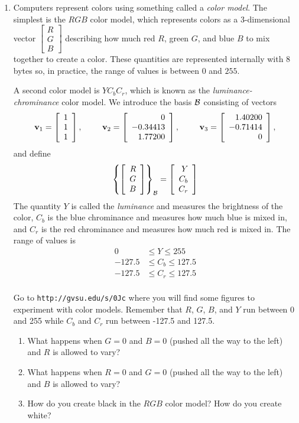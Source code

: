 \documentclass[12pt]{article}
\newcommand{\vs}[1]{\vspace{#1in}}
\newcommand{\vvec}{{\mathbf v}}
\newcommand{\threevec}[3]{\left[\begin{array}{r}#1 \\ #2 \\ #3
  \end{array}\right]}
\newcommand{\bcal}{{\cal B}}
\newcommand{\coords}[2]{\left\{#1\right\}_{#2}}
\begin{document}
\begin{enumerate}
  \vs{1}

\item Computers represent colors using something called a  {\em color
    model}.  The simplest is the $RGB$ color
  model, which represents colors as a 3-dimensional vector
  $\threevec RGB$ describing how much red $R$, green $G$, and blue $B$
  to mix together to create a color.  These quantities are represented
  internally with 8 bytes so, in practice, the range of values is
  between $0$ and $255$.

  A second color model is $YC_bC_r$, which is known as the {\em
    luminance-chrominance} color model.  We introduce the
  basis $\bcal$ consisting of vectors
  $$
  \vvec_1 = \threevec 111, \hspace*{24pt}
  \vvec_2 = \threevec 0{-0.34413}{1.77200}, \hspace*{24pt}
  \vvec_3 = \threevec {1.40200}{-0.71414}0,
  $$
  and define
  $$
  \coords{\threevec RGB}{\bcal} = \threevec Y{C_b}{C_r}$$
  The quantity $Y$ is called the {\em luminance} and measures the
  brightness of the color, $C_b$ is the blue chrominance and measures
  how much blue is mixed in, and $C_r$ is the red chrominance and
  measures how much red is mixed in.  The range of values is
  $$
  \begin{aligned}
    0 & \leq Y \leq 255 \\
    -127.5 & \leq C_b \leq 127.5 \\
    -127.5 & \leq C_r \leq 127.5 \\
  \end{aligned}
  $$

  Go to {\tt http://gvsu.edu/s/0Jc} where you will find some
  figures to experiment with color models.  Remember that $R$, $G$,
  $B$, and $Y$ run between 0 and 255 while $C_b$ and $C_r$ run between
  -127.5 and 127.5.

  \begin{enumerate}[label=(\alph*)]
  \item What happens when $G=0$ and $B=0$ (pushed all the way to the
    left) and $R$ is allowed to vary?

    \vs{0.5}
    
  \item What happens when $R=0$ and $G=0$ (pushed all the way to the
    left) and $B$ is allowed to vary?

    \vs{0.5}

  \item How do you create black in the $RGB$ color model?  How do you
    create white?


\end{enumerate}
\end{enumerate}
\end{document}
